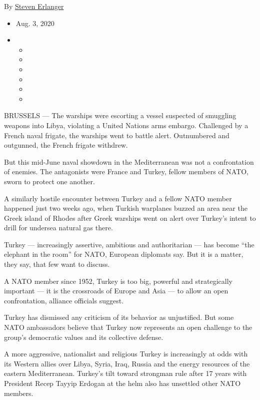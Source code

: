 By \href{https://www.nytimes3xbfgragh.onion/by/steven-erlanger}{Steven
Erlanger}

\begin{itemize}
\item
  Aug. 3, 2020
\item
  \begin{itemize}
  \item
  \item
  \item
  \item
  \item
  \item
  \end{itemize}
\end{itemize}

BRUSSELS --- The warships were escorting a vessel suspected of smuggling
weapons into Libya, violating a United Nations arms embargo. Challenged
by a French naval frigate, the warships went to battle alert.
Outnumbered and outgunned, the French frigate withdrew.

But this mid-June naval showdown in the Mediterranean was not a
confrontation of enemies. The antagonists were France and Turkey, fellow
members of NATO, sworn to protect one another.

A similarly hostile encounter between Turkey and a fellow NATO member
happened just two weeks ago, when Turkish warplanes buzzed an area near
the Greek island of Rhodes after Greek warships went on alert over
Turkey's intent to drill for undersea natural gas there.

Turkey --- increasingly assertive, ambitious and authoritarian --- has
become ``the elephant in the room'' for NATO, European diplomats say.
But it is a matter, they say, that few want to discuss.

A NATO member since 1952, Turkey is too big, powerful and strategically
important --- it is the crossroads of Europe and Asia --- to allow an
open confrontation, alliance officials suggest.

Turkey has dismissed any criticism of its behavior as unjustified. But
some NATO ambassadors believe that Turkey now represents an open
challenge to the group's democratic values and its collective defense.

A more aggressive, nationalist and religious Turkey is increasingly at
odds with its Western allies over Libya, Syria, Iraq, Russia and the
energy resources of the eastern Mediterranean. Turkey's tilt toward
strongman rule after 17 years with President Recep Tayyip Erdogan at the
helm also has unsettled other NATO members.

